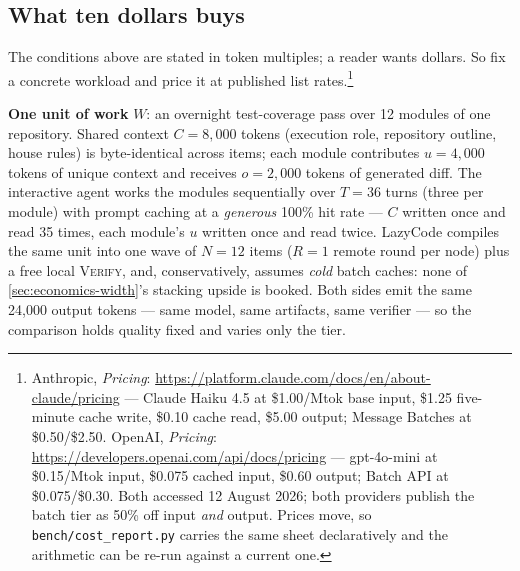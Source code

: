 \documentclass[11pt]{article}
\begin{document}
\subsection{What ten dollars buys}
\label{sec:tendollars}

The conditions above are stated in token multiples; a reader wants dollars. So fix a concrete workload and price it at published list rates.\footnote{{\sloppy Anthropic, \emph{Pricing}: \url{https://platform.claude.com/docs/en/about-claude/pricing} --- Claude Haiku 4.5 at \$1.00/Mtok base input, \$1.25 five-minute cache write, \$0.10 cache read, \$5.00 output; Message Batches at \$0.50/\$2.50. OpenAI, \emph{Pricing}: \url{https://developers.openai.com/api/docs/pricing} --- gpt-4o-mini at \$0.15/Mtok input, \$0.075 cached input, \$0.60 output; Batch API at \$0.075/\$0.30. Both accessed 12 August 2026; both providers publish the batch tier as 50\% off input \emph{and} output. Prices move, so \texttt{bench/cost\_report.py} carries the same sheet declaratively and the arithmetic can be re-run against a current one.\par}}

\textbf{One unit of work} $W$: an overnight test-coverage pass over 12 modules of one repository. Shared context $C = 8{,}000$ tokens (execution role, repository outline, house rules) is byte-identical across items; each module contributes $u = 4{,}000$ tokens of unique context and receives $o = 2{,}000$ tokens of generated diff. The interactive agent works the modules sequentially over $T = 36$ turns (three per module) with prompt caching at a \emph{generous} 100\% hit rate --- $C$ written once and read 35 times, each module's $u$ written once and read twice. LazyCode compiles the same unit into one wave of $N = 12$ items ($R = 1$ remote round per node) plus a free local \textsc{Verify}, and, conservatively, assumes \emph{cold} batch caches: none of \cref{sec:economics-width}'s stacking upside is booked. Both sides emit the same 24{,}000 output tokens --- same model, same artifacts, same verifier --- so the comparison holds quality fixed and varies only the tier.
\end{document}
